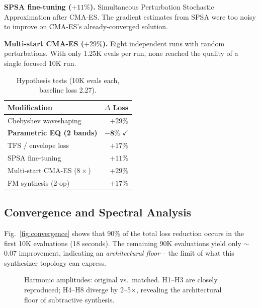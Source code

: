 \documentclass[10pt,twocolumn]{article}
\begin{document}
\textbf{SPSA fine-tuning ($+11\%$).} Simultaneous Perturbation Stochastic Approximation after CMA-ES. The gradient estimates from SPSA were too noisy to improve on CMA-ES's already-converged solution.

\textbf{Multi-start CMA-ES ($+29\%$).} Eight independent runs with random perturbations. With only 1.25K evals per run, none reached the quality of a single focused 10K run.

\begin{table}[t]
\centering
\small
\caption{Hypothesis tests (10K evals each, baseline loss 2.27).}
\label{tab:hyp}
\begin{tabular}{@{}lr@{}}
\toprule
\textbf{Modification} & \textbf{$\Delta$ Loss} \\
\midrule
Chebyshev waveshaping & $+29\%$ \\
\textbf{Parametric EQ (2 bands)} & $\mathbf{-8\%}$ {\color{green!50!black}$\checkmark$} \\
TFS / envelope loss & $+17\%$ \\
SPSA fine-tuning & $+11\%$ \\
Multi-start CMA-ES ($8{\times}$) & $+29\%$ \\
FM synthesis (2-op) & $+17\%$ \\
\bottomrule
\end{tabular}
\end{table}

\subsection{Convergence and Spectral Analysis}

Fig.~\ref{fig:convergence} shows that 90\% of the total loss reduction occurs in the first 10K evaluations (18 seconds). The remaining 90K evaluations yield only $\sim$0.07 improvement, indicating an \emph{architectural floor} -- the limit of what this synthesizer topology can express.

\begin{figure}[t]
\centering
{}
\caption{Harmonic amplitudes: original vs.\ matched. H1--H3 are closely reproduced; H4--H8 diverge by 2--5$\times$, revealing the architectural floor of subtractive synthesis.}
\label{fig:harmonics}
\end{figure}
\end{document}
